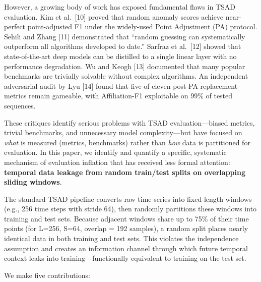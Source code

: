 \documentclass[
]{article}
\begin{document}
However, a growing body of work has exposed fundamental flaws in TSAD
evaluation. Kim et al.~{[}10{]} proved that random anomaly scores
achieve near-perfect point-adjusted F1 under the widely-used Point
Adjustment (PA) protocol. Sehili and Zhang {[}11{]} demonstrated that
``random guessing can systematically outperform all algorithms developed
to date.'' Sarfraz et al.~{[}12{]} showed that state-of-the-art deep
models can be distilled to a single linear layer with no performance
degradation. Wu and Keogh {[}13{]} documented that many popular
benchmarks are trivially solvable without complex algorithms. An
independent adversarial audit by Lyu {[}14{]} found that five of eleven
post-PA replacement metrics remain gameable, with Affiliation-F1
exploitable on 99\% of tested sequences.

These critiques identify serious problems with TSAD evaluation---biased
metrics, trivial benchmarks, and unnecessary model complexity---but have
focused on \emph{what} is measured (metrics, benchmarks) rather than
\emph{how} data is partitioned for evaluation. In this paper, we
identify and quantify a specific, systematic mechanism of evaluation
inflation that has received less formal attention: \textbf{temporal data
leakage from random train/test splits on overlapping sliding windows}.

The standard TSAD pipeline converts raw time series into fixed-length
windows (e.g., 256 time steps with stride 64), then randomly partitions
these windows into training and test sets. Because adjacent windows
share up to 75\% of their time points (for L=256, S=64, overlap = 192
samples), a random split places nearly identical data in both training
and test sets. This violates the independence assumption and creates an
information channel through which future temporal context leaks into
training---functionally equivalent to training on the test set.

We make five contributions:
\end{document}
